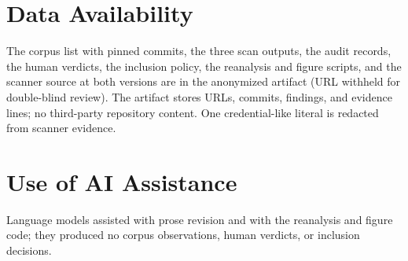 \documentclass[10pt,conference]{IEEEtran}
\begin{document}
\section*{Data Availability}
The corpus list with pinned commits, the three scan outputs, the audit records, the human verdicts, the inclusion policy, the reanalysis and figure scripts, and the scanner source at both versions are in the anonymized artifact (URL withheld for double-blind review). The artifact stores URLs, commits, findings, and evidence lines; no third-party repository content. One credential-like literal is redacted from scanner evidence.

\section*{Use of AI Assistance}
Language models assisted with prose revision and with the reanalysis and figure code; they produced no corpus observations, human verdicts, or inclusion decisions.

\balance


\end{document}
